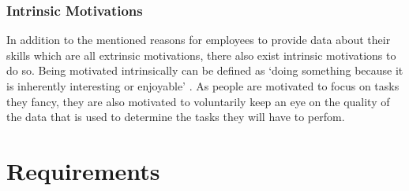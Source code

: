 \subsubsection{Intrinsic Motivations}
In addition to the mentioned reasons for employees to provide data about their skills which are all extrinsic motivations,
there also exist intrinsic motivations to do so. Being motivated intrinsically can be defined as `doing something because it is inherently interesting or enjoyable' \cite{RYAN200054}. As people are motivated to focus on tasks they fancy, they are also motivated to voluntarily keep an eye on the quality of the data that is used to determine the tasks they will have to perfom.


\section{Requirements}
